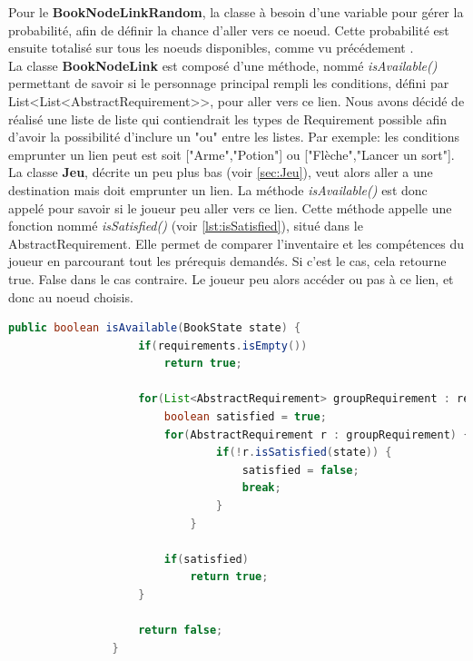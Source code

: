 			Pour le \textbf{BookNodeLinkRandom}, la classe à besoin d'une variable pour gérer la probabilité, afin de définir la chance d'aller vers ce noeud. Cette probabilité est ensuite totalisé sur tous les noeuds disponibles, comme vu précédement .\\

			La classe \textbf{BookNodeLink} est composé d'une méthode, nommé \textit{isAvailable()} permettant de savoir si le personnage principal rempli les conditions, défini par List<List<AbstractRequirement>>, pour aller vers ce lien. Nous avons décidé de réalisé une liste de liste qui contiendrait les types de Requirement possible afin d'avoir la possibilité d'inclure un "ou" entre les listes. Par exemple: les conditions emprunter un lien peut est soit ["Arme","Potion"] ou ["Flèche","Lancer un sort"].\\
			La classe \textbf{Jeu}, décrite un peu plus bas (voir \ref{sec:Jeu}), veut alors aller a une destination mais doit emprunter un lien. La méthode \textit{isAvailable()} est donc appelé pour savoir si le joueur peu aller vers ce lien. Cette méthode appelle une fonction nommé \textit{isSatisfied()} (voir \ref{lst:isSatisfied}), situé dans le AbstractRequirement. Elle permet de comparer l'inventaire et les compétences du joueur en parcourant tout les prérequis demandés. Si c'est le cas, cela retourne true. False dans le cas contraire. Le joueur peu alors accéder ou pas à ce lien, et donc au noeud choisis.

			\begin{lstlisting}[gobble=12, language=java, caption=exemple de isAvailable()]
				public boolean isAvailable(BookState state) {
					if(requirements.isEmpty())
						return true;

					for(List<AbstractRequirement> groupRequirement : requirements) {
						boolean satisfied = true;
						for(AbstractRequirement r : groupRequirement) {
								if(!r.isSatisfied(state)) {
									satisfied = false;
									break;
								}
							}

						if(satisfied)
							return true;
					}

					return false;
				}
			\end{lstlisting}

